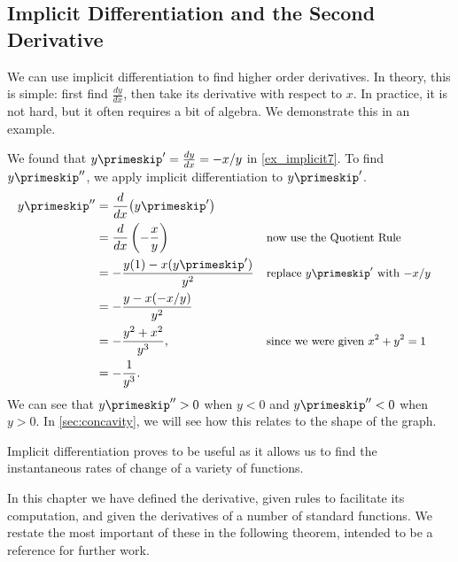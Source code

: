 \subsection*{Implicit Differentiation and the Second Derivative}

We can use implicit differentiation to find higher order derivatives. In theory, this is simple: first find $\frac{dy}{dx}$, then take its derivative with respect to $x$. In practice, it is not hard, but it often requires a bit of algebra. We demonstrate this in an example.

{We found that $y\primeskip' = \frac{dy}{dx} = -x/y$ in \autoref{ex_implicit7}. To find $y\primeskip''$, we apply implicit differentiation to $y\primeskip'$.
\begin{align*}
	y\primeskip''
	&= \frac{d}{dx}\big(y\primeskip'\big) \\
	&= \frac{d}{dx}\left(-\frac xy\right) && \text{\small now use the Quotient Rule} \\
	&= -\frac{y(1) - x(y\primeskip')}{y^2} && \text{\small replace $y\primeskip'$ with $-x/y$} \\
	&= -\frac{y-x(-x/y)}{y^2}\\
	&= -\frac{y^2+x^2}{y^3}, && \text{\small since we were given $x^2+y^2=1$} \\
	&= -\frac1{y^3}.
\end{align*}
We can see that $y\primeskip''>0$ when $y<0$ and $y\primeskip''<0$ when $y>0$. In \autoref{sec:concavity}, we will see how this relates to the shape of the graph.}


Implicit differentiation proves to be useful as it allows us to find the instantaneous rates of change of a variety of functions.

In this chapter we have defined the derivative, given rules to facilitate its computation, and given the derivatives of a number of standard functions. We restate the most important of these in the following theorem, intended to be a reference for further work.

